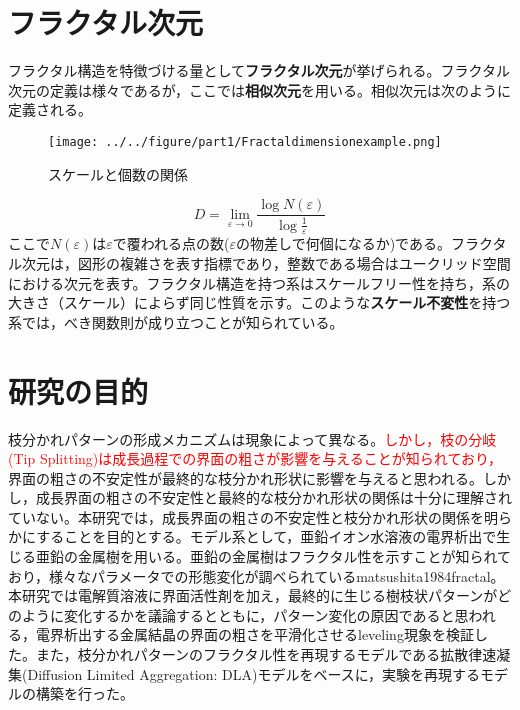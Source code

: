 \documentclass[autodetect-engine,dvi=dvipdfmx,a4paper,ja=standard,oneside,openany,11pt,draft]{bxjsbook}
\begin{document}
\section{フラクタル次元}
フラクタル構造を特徴づける量として\textbf{フラクタル次元}が挙げられる。フラクタル次元の定義は様々であるが，ここでは\textbf{相似次元}を用いる。相似次元は次のように定義される。
\begin{wrapfigure}{r}[0pt]{0.33\textwidth}
  \begin{center}
    \texttt{[image: ../../figure/part1/Fractaldimensionexample.png]}
  \end{center}
  \caption{スケールと個数の関係\cite{}}
  \label{fig:相似次元の考え方}
\end{wrapfigure}
\begin{equation}
  D=\lim_{\varepsilon \to 0}\frac{\log N(\varepsilon)}{\log \frac{1}{\varepsilon}}
\end{equation}
ここで$N(\varepsilon)$は$\varepsilon$で覆われる点の数($\varepsilon$の物差しで何個になるか)である。フラクタル次元は，図形の複雑さを表す指標であり，整数である場合はユークリッド空間における次元を表す。フラクタル構造を持つ系はスケールフリー性を持ち，系の大きさ（スケール）によらず同じ性質を示す。このような\textbf{スケール不変性}を持つ系では，べき関数則が成り立つことが知られている。
\section{研究の目的}
枝分かれパターンの形成メカニズムは現象によって異なる。\textcolor{red}{しかし，枝の分岐(Tip Splitting)は成長過程での界面の粗さが影響を与える\cite{}ことが知られており，}界面の粗さの不安定性が最終的な枝分かれ形状に影響を与えると思われる。しかし，成長界面の粗さの不安定性と最終的な枝分かれ形状の関係は十分に理解されていない。本研究では，成長界面の粗さの不安定性と枝分かれ形状の関係を明らかにすることを目的とする。モデル系として，亜鉛イオン水溶液の電界析出で生じる亜鉛の金属樹を用いる。亜鉛の金属樹はフラクタル性を示すことが知られており\cite{matsushita1984fractal}，様々なパラメータでの形態変化が調べられている\cite{suda2003temperature}{matsushita1984fractal}。本研究では電解質溶液に界面活性剤を加え，最終的に生じる樹枝状パターンがどのように変化するかを議論するとともに，パターン変化の原因であると思われる，電界析出する金属結晶の界面の粗さを平滑化させるleveling現象を検証した。また，枝分かれパターンのフラクタル性を再現するモデルである拡散律速凝集(Diffusion Limited Aggregation: DLA)モデル\cite{witten1981diffusion}をベースに，実験を再現するモデルの構築を行った。

\ifdraft{
  
  
}{}
\end{document}
